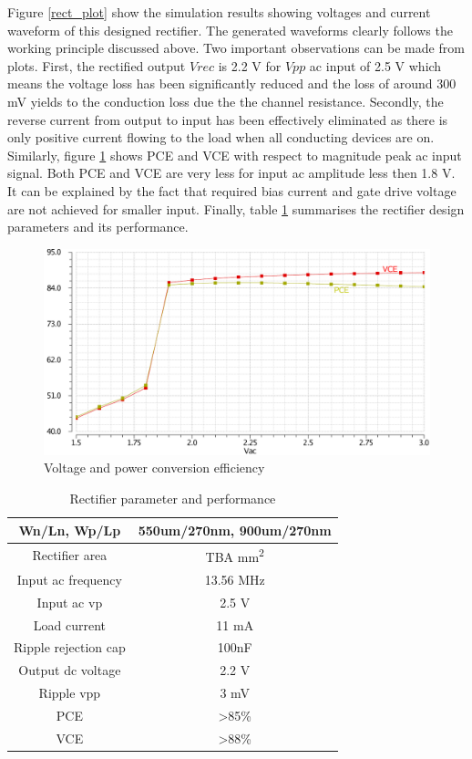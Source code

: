 \documentclass[12pt,a4paper,UKenglish]{article}
\begin{document}
Figure \ref{rect_plot} show the simulation results showing voltages and current waveform of this designed rectifier. The generated waveforms clearly follows the working principle discussed above. Two important observations can be made from plots. First, the rectified output $Vrec$ is 2.2 V for $Vpp$ ac input of 2.5 V which means the voltage loss has been significantly reduced and the loss of around 300 mV yields to the conduction loss due the the channel resistance. Secondly, the reverse current from output to input has been effectively eliminated as there is only positive current flowing to the load when all conducting devices are on.  Similarly, figure  \ref{rect_ce} shows PCE and VCE with respect to magnitude peak ac input signal. Both PCE and VCE are very less for input ac amplitude less then 1.8 V. It can be explained by the fact that required bias current and gate drive voltage are not achieved for smaller input. Finally, table \ref{rect_spec} summarises the rectifier design parameters and its performance.

\begin{figure}[htbp] %
   \centering
   \includegraphics[width=.9\textwidth]{img/rect_ce.pdf} 
   \caption{Voltage and power conversion efficiency}
   \label{rect_ce}
\end{figure}

\begin{table}[htbp]
\caption{Rectifier parameter and performance}
\begin{center}
\begin{tabular}{c|c}
\hline \hline
Wn/Ln, Wp/Lp & 550um/270nm, 900um/270nm \\ \hline
Rectifier area & TBA mm\textsuperscript{2} \\ \hline
Input ac frequency & 13.56 MHz \\ \hline
Input ac \acrshort{vp} & 2.5 V \\ \hline
Load current & 11 mA \\ \hline
Ripple rejection cap & 100nF \\ \hline
Output dc voltage & 2.2 V \\ \hline
Ripple \acrshort{vpp} & 3 mV \\ \hline
PCE & >85\% \\ \hline
VCE & >88\% \\
\hline \hline
\end{tabular}
\end{center}
\label{rect_spec}
\end{table}
\end{document}
